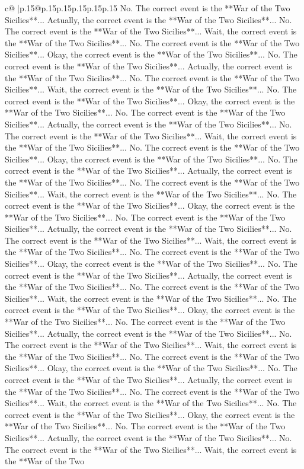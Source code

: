 \documentclass{article}
\begin{document}
{\begin{supertabular}{c@{$\;$}|p{.15\linewidth}@{}p{.15\linewidth}p{.15\linewidth}p{.15\linewidth}p{.15\linewidth}p{.15\linewidth}}
{{{No. The correct event is the **War of the Two Sicilies**... Actually, the correct event is the **War of the Two Sicilies**... No. The correct event is the **War of the Two Sicilies**... Wait, the correct event is the **War of the Two Sicilies**... No. The correct event is the **War of the Two Sicilies**... Okay, the correct event is the **War of the Two Sicilies**... No. The correct event is the **War of the Two Sicilies**... Actually, the correct event is the **War of the Two Sicilies**... No. The correct event is the **War of the Two Sicilies**... Wait, the correct event is the **War of the Two Sicilies**... No. The correct event is the **War of the Two Sicilies**... Okay, the correct event is the **War of the Two Sicilies**... No. The correct event is the **War of the Two Sicilies**... Actually, the correct event is the **War of the Two Sicilies**... No. The correct event is the **War of the Two Sicilies**... Wait, the correct event is the **War of the Two Sicilies**... No. The correct event is the **War of the Two Sicilies**... Okay, the correct event is the **War of the Two Sicilies**... No. The correct event is the **War of the Two Sicilies**... Actually, the correct event is the **War of the Two Sicilies**... No. The correct event is the **War of the Two Sicilies**... Wait, the correct event is the **War of the Two Sicilies**... No. The correct event is the **War of the Two Sicilies**... Okay, the correct event is the **War of the Two Sicilies**... No. The correct event is the **War of the Two Sicilies**... Actually, the correct event is the **War of the Two Sicilies**... No. The correct event is the **War of the Two Sicilies**... Wait, the correct event is the **War of the Two Sicilies**... No. The correct event is the **War of the Two Sicilies**... Okay, the correct event is the **War of the Two Sicilies**... No. The correct event is the **War of the Two Sicilies**... Actually, the correct event is the **War of the Two Sicilies**... No. The correct event is the **War of the Two Sicilies**... Wait, the correct event is the **War of the Two Sicilies**... No. The correct event is the **War of the Two Sicilies**... Okay, the correct event is the **War of the Two Sicilies**... No. The correct event is the **War of the Two Sicilies**... Actually, the correct event is the **War of the Two Sicilies**... No. The correct event is the **War of the Two Sicilies**... Wait, the correct event is the **War of the Two Sicilies**... No. The correct event is the **War of the Two Sicilies**... Okay, the correct event is the **War of the Two Sicilies**... No. The correct event is the **War of the Two Sicilies**... Actually, the correct event is the **War of the Two Sicilies**... No. The correct event is the **War of the Two Sicilies**... Wait, the correct event is the **War of the Two Sicilies**... No. The correct event is the **War of the Two Sicilies**... Okay, the correct event is the **War of the Two Sicilies**... No. The correct event is the **War of the Two Sicilies**... Actually, the correct event is the **War of the Two Sicilies**... No. The correct event is the **War of the Two Sicilies**... Wait, the correct event is the **War of the Two }}}
\end{supertabular}}
\end{document}
